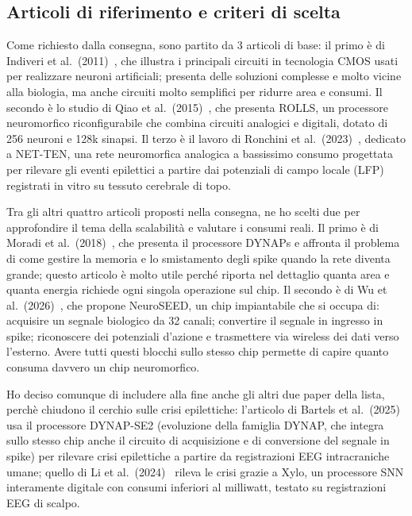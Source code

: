 \newpage

\subsection{Articoli di riferimento e criteri di scelta}
\label{subsec:perimetro}

Come richiesto dalla consegna, sono partito da 3 articoli di base: il primo è di Indiveri et al.\ (2011)~\cite{indiveri2011}, che illustra i principali circuiti in tecnologia CMOS usati per realizzare neuroni artificiali; presenta delle soluzioni complesse e molto vicine alla biologia, ma anche circuiti molto semplifici per ridurre area e consumi. Il secondo è lo studio di Qiao et al.\ (2015)~\cite{qiao2015}, che presenta ROLLS, un processore neuromorfico riconfigurabile che combina circuiti analogici e digitali, dotato di 256 neuroni e 128k sinapsi. Il terzo è il lavoro di Ronchini et al.\ (2023)~\cite{ronchini2023}, dedicato a NET-TEN, una rete neuromorfica analogica a bassissimo consumo progettata per rilevare gli eventi epilettici a partire dai potenziali di campo locale (LFP) registrati in vitro su tessuto cerebrale di topo.

Tra gli altri quattro articoli proposti nella consegna, ne ho scelti due per approfondire il tema della scalabilità e valutare i consumi reali. Il primo è di Moradi et al.\ (2018)~\cite{moradi2018}, che presenta il processore DYNAPs e affronta il problema di come gestire la memoria e lo smistamento degli spike quando la rete diventa grande; questo articolo è molto utile perché riporta nel dettaglio quanta area e quanta energia richiede ogni singola operazione sul chip. Il secondo è di Wu et al.\ (2026)~\cite{wu2026}, che propone NeuroSEED, un chip impiantabile che si occupa di: acquisire un segnale biologico da 32 canali; convertire il segnale in ingresso in spike; riconoscere dei potenziali d'azione e trasmettere via wireless dei dati verso l'esterno. Avere tutti questi blocchi sullo stesso chip permette di capire quanto consuma davvero un chip neuromorfico.

Ho deciso comunque di includere alla fine anche gli altri due paper della lista, perchè chiudono il cerchio sulle crisi epilettiche: l'articolo di Bartels et al.\ (2025)~\cite{bartels2025} usa il processore DYNAP-SE2 (evoluzione della famiglia DYNAP, che integra sullo stesso chip anche il circuito di acquisizione e di conversione del segnale in spike) per rilevare crisi epilettiche a partire da registrazioni EEG intracraniche umane; quello di Li et al.\ (2024)~\cite{li2024} rileva le crisi grazie a Xylo, un processore SNN interamente digitale con consumi inferiori al milliwatt, testato su registrazioni EEG di scalpo.

